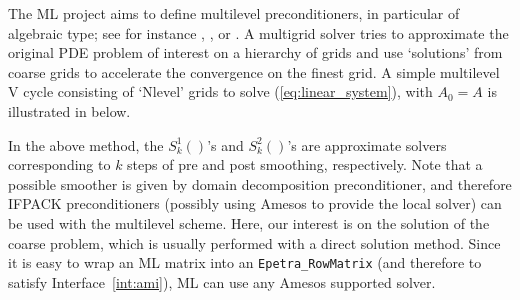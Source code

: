 \documentclass[acmtocl]{acmtrans2m}
\begin{document}
The ML project aims to define multilevel preconditioners, in particular of
algebraic type; see for instance \cite{brandt.classic}, \cite{hack.book}, or
\cite{hack2.book}.
A multigrid solver tries to approximate
the original PDE problem of interest on a hierarchy of grids and use
`solutions' from coarse grids to accelerate the convergence
on the finest grid.  A simple multilevel 
 V cycle consisting of `Nlevel' grids to
  solve (\ref{eq:linear_system}), with $A_0 = A$
is illustrated in below.

In the above method, the $S^{1}_k()$'s and $S^{2}_k()$'s are approximate
solvers corresponding to $k$ steps of pre and post smoothing,
respectively. Note that a possible smoother is given by domain decomposition
preconditioner, and therefore IFPACK preconditioners 
(possibly using Amesos to provide the local solver) can be used with the
multilevel scheme. Here, our interest is on the solution of the coarse
problem, which is usually performed with a direct solution method. Since it is
easy to wrap an ML matrix into an \verb!Epetra_RowMatrix! (and therefore 
to satisfy Interface~\ref{int:ami}), ML can use any Amesos supported solver. 
\end{document}
